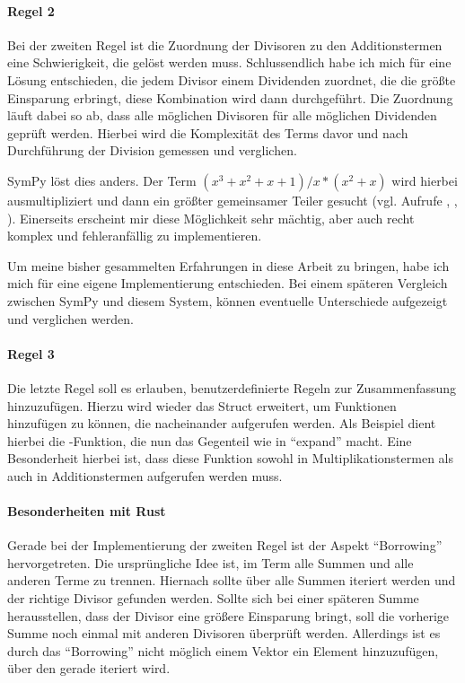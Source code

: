 \documentclass[11pt,a4paper, ngerman]{article}
\begin{document}
\paragraph{Regel 2} Bei der zweiten Regel ist die Zuordnung der Divisoren zu den Additionstermen eine Schwierigkeit, die gelöst werden muss. Schlussendlich habe ich mich für eine Lösung entschieden, die jedem Divisor einem Dividenden zuordnet, die die größte Einsparung erbringt, diese Kombination wird dann durchgeführt. Die Zuordnung läuft dabei so ab, dass alle möglichen Divisoren für alle möglichen Dividenden geprüft werden. Hierbei wird die Komplexität des Terms davor und nach Durchführung der Division gemessen und verglichen.

SymPy löst dies anders. Der Term $(x^3+x^2+x+1)/x*(x^2+x)$ wird hierbei ausmultipliziert und dann ein größter gemeinsamer Teiler gesucht (vgl. \cite{SymPySimplifySrc} Aufrufe , , ). Einerseits erscheint mir diese Möglichkeit sehr mächtig, aber auch recht komplex und fehleranfällig zu implementieren.

Um meine bisher gesammelten Erfahrungen in diese Arbeit zu bringen, habe ich mich für eine eigene Implementierung entschieden. Bei einem späteren Vergleich zwischen SymPy und diesem System, können eventuelle Unterschiede aufgezeigt und verglichen werden.

\paragraph{Regel 3} Die letzte Regel soll es erlauben, benutzerdefinierte Regeln zur Zusammenfassung hinzuzufügen. Hierzu wird wieder das Struct  erweitert, um Funktionen hinzufügen zu können, die nacheinander aufgerufen werden. Als Beispiel dient hierbei die -Funktion, die nun das Gegenteil wie in ``expand'' macht. Eine Besonderheit hierbei ist, dass diese Funktion sowohl in Multiplikationstermen als auch in Additionstermen aufgerufen werden muss.

\paragraph{Besonderheiten mit Rust} Gerade bei der Implementierung der zweiten Regel ist der Aspekt ``Borrowing'' hervorgetreten. Die ursprüngliche Idee ist, im Term alle Summen und alle anderen Terme zu trennen. Hiernach sollte über alle Summen iteriert werden und der richtige Divisor gefunden werden. Sollte sich bei einer späteren Summe herausstellen, dass der Divisor eine größere Einsparung bringt, soll die vorherige Summe noch einmal mit anderen Divisoren überprüft werden. Allerdings ist es durch das ``Borrowing'' nicht möglich einem Vektor ein Element hinzuzufügen, über den gerade iteriert wird.
\end{document}
